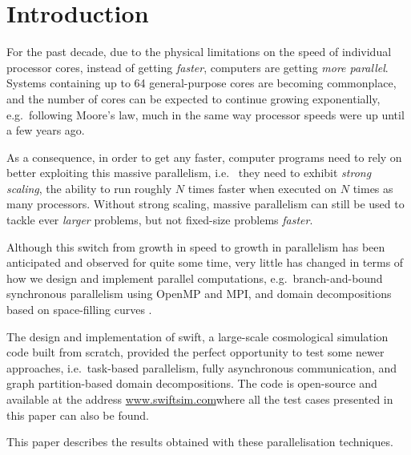 \documentclass{sig-alternate-05-2015}
\newcommand{\swift}{{\sc swift}\xspace}
\newcommand{\web}{\url{www.swiftsim.com}}
\begin{document}



\section{Introduction}

For the past decade, due to the physical limitations
on the speed of individual processor cores, instead of
getting {\em faster}, computers are getting {\em more parallel}.
Systems containing up to 64 general-purpose cores are becoming
commonplace, and the number of cores can be expected to continue
growing exponentially, e.g.~following Moore's law, much in the
same way processor speeds were up until a few years ago.

As a consequence, in order to get any faster, computer programs
need to rely on better exploiting this massive parallelism, i.e.~
they need to exhibit {\em strong scaling}, the ability to run
roughly $N$ times faster when executed on $N$ times as many processors.
Without strong scaling, massive parallelism can still be used to
tackle ever {\em larger} problems, but not fixed-size problems
{\em faster}.

Although this switch from growth in speed to growth in parallelism
has been anticipated and observed for quite some time, very little
has changed in terms of how we design and implement parallel
computations, e.g.~branch-and-bound synchronous parallelism using
OpenMP\cite{ref:Dagum1998} and MPI\cite{ref:Snir1998}, and domain
decompositions based on space-filling curves \cite{warren1993parallel}.

The design and implementation of \swift \cite{gonnet2013swift,%
  theuns2015swift,gonnet2015efficient}, a large-scale cosmological simulation
code built from scratch, provided the perfect opportunity to test some newer
approaches, i.e.~task-based parallelism, fully asynchronous communication, and
graph partition-based domain decompositions. The code is open-source and
available at the address \web where all the test cases
presented in this paper can also be found.

This paper describes the results obtained with these parallelisation techniques.


\end{document}
